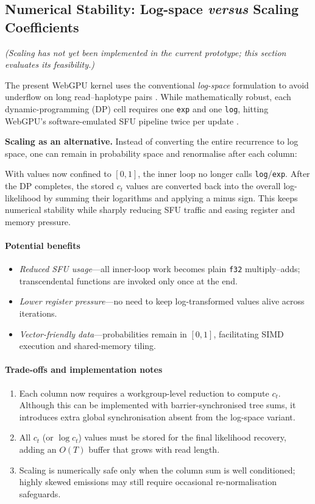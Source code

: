 \documentclass[PhD]{PHlab-thesis}
\begin{document}
\subsection{Numerical Stability: Log-space \emph{versus} Scaling Coefficients}

\textit{(Scaling has not yet been implemented in the current prototype; this section evaluates its feasibility.)}

The present WebGPU kernel uses the conventional \emph{log-space} formulation to avoid underflow on long read–haplotype pairs \cite{Durbin1998}.  
While mathematically robust, each dynamic-programming (DP) cell requires one \texttt{exp} and one \texttt{log}, hitting WebGPU’s software-emulated SFU pipeline twice per update \cite{NVIDIA2023-cudaguide} .

\vspace{0.4em}
\noindent\textbf{Scaling as an alternative.}\;
Instead of converting the entire recurrence to log space, one can remain in probability space and renormalise after each column:

With values now confined to $[0,1]$, the inner loop no longer calls \texttt{log}/\texttt{exp}.  
After the DP completes, the stored $c_{t}$ values are converted back into the overall log-likelihood by summing their logarithms and applying a minus sign.  
This keeps numerical stability while sharply reducing SFU traffic and easing register and memory pressure.

\paragraph{Potential benefits}
\begin{itemize}
  \item \emph{Reduced SFU usage}—all inner-loop work becomes plain \texttt{f32} multiply–adds; transcendental functions are invoked only once at the end.
  \item \emph{Lower register pressure}—no need to keep log-transformed values alive across iterations.
  \item \emph{Vector-friendly data}—probabilities remain in $[0,1]$, facilitating SIMD execution and shared-memory tiling.
\end{itemize}

\paragraph{Trade-offs and implementation notes}
\begin{enumerate}
  \item Each column now requires a workgroup-level reduction to compute $c_{t}$.  
        Although this can be implemented with barrier-synchronised tree sums, it introduces extra global synchronisation absent from the log-space variant.
  \item All $c_{t}$ (or $\log c_{t}$) values must be stored for the final likelihood recovery, adding an $O(T)$ buffer that grows with read length.
  \item Scaling is numerically safe only when the column sum is well conditioned; highly skewed emissions may still require occasional re-normalisation safeguards.
\end{enumerate}
\end{document}
